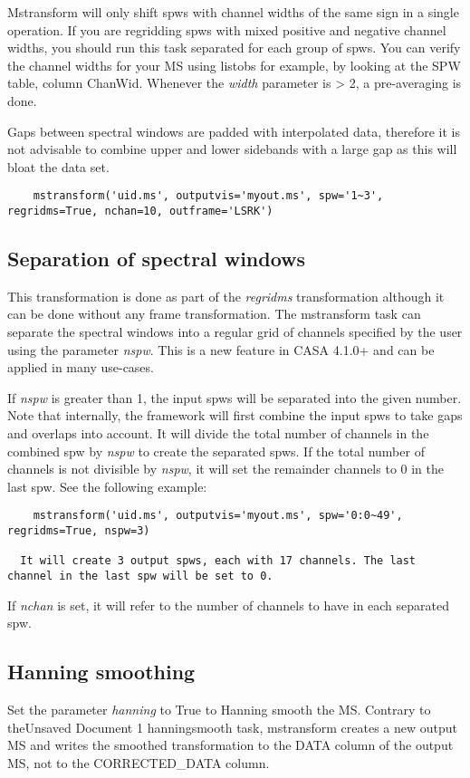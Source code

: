 Mstransform will only shift spws with channel widths of the same sign in a
single operation. If you are regridding spws with mixed positive and negative channel widths, 
you should run this task separated for each group of spws. You can verify the channel widths 
for your MS using listobs for example, by looking at the SPW table, column
ChanWid. Whenever the {\it width} parameter is > 2, a pre-averaging is done. 

Gaps between spectral windows are padded with interpolated data, therefore it is
not advisable to combine upper and lower sidebands with a large gap as this will
bloat the data set. 

\begin{verbatim}
    mstransform('uid.ms', outputvis='myout.ms', spw='1~3', regridms=True, nchan=10, outframe='LSRK')
\end{verbatim}

\subsection{Separation of spectral windows}
This transformation is done as part of the {\it regridms} transformation
although it can be done without any frame transformation. The mstransform
task can separate the spectral windows into a regular grid of channels specified
by the user using the parameter {\it nspw}. This is a new feature in CASA
4.1.0+ and can be applied in many use-cases. %

If {\it nspw} is greater than 1, the input spws will be separated into the given
number. Note that internally, the framework will first combine the input
spws to take gaps and overlaps into account. It will divide the total number of
channels in the combined spw by {\it nspw} to create the separated spws. If the
total number of channels is not divisible by {\it nspw}, it will set the
remainder channels to 0 in the last spw. See the following example:

\begin{verbatim}
    mstransform('uid.ms', outputvis='myout.ms', spw='0:0~49', regridms=True, nspw=3)
  
  It will create 3 output spws, each with 17 channels. The last channel in the last spw will be set to 0.
\end{verbatim}

If {\it nchan} is set, it will refer to the number of channels to have in each
separated spw. 

\subsection{Hanning smoothing}
Set the parameter {\it hanning} to True to Hanning smooth the MS. Contrary to
theUnsaved Document 1 hanningsmooth task, mstransform creates a new output MS and writes the smoothed transformation
to the DATA column of the output MS, not to the CORRECTED_DATA column.

